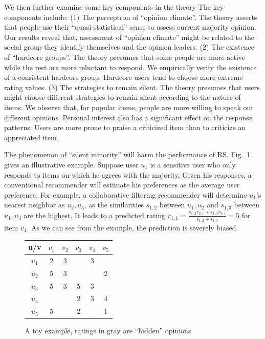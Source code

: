 \documentclass{sig-alternate}
\begin{document}
We then further examine some key components in the theory  The key components include: (1) The perceptron of ``opinion climate''. The theory asserts that people use their ``quasi-statistical'' sense to assess current majority opinion. Our results reveal that, assessment of ``opinion climate'' might be related to the social group they identify themselves and the opinion leaders. (2) The existence of ``hardcore groups''. The theory presumes that some people are more active while the rest are more reluctant to respond. We empirically verify the existence of a consistent hardcore group. Hardcore users tend to choose more extreme rating values. (3) The strategies to remain silent. The theory presumes that users might choose different strategies to remain silent according to the nature of items. We observe that, for popular items, people are more willing to speak out different opinions. Personal interest also has a significant effect on the response patterns. Users are more prone to praise a criticized item than to criticize an appreciated item.


The phenomenon of ``silent minority'' will harm the performance of RS. Fig.~\ref{fig:example} gives an illustrative example. Suppose user $u_1$ is a sensitive user who only responds to items on which he agrees with the majority. Given his responses, a conventional recommender will estimate his preferences as the average user preference. For example, a collaborative filtering recommender will determine $u_1$'s nearest neighbor as $u_2,u_3$, as the similarities    $s_{1,2}$ between $u_1,u_2$ and $s_{1,3}$ between $u_1,u_3$ are the highest. It leads to a predicted rating $r_{1,1}=\frac{s_{1,2} r_{2,1}+s_{1,3} r_{3,1}}{s_{1,2}+s_{1,3} }=5$ for item $v_1$. As we can see from the example, the prediction is severely biased.

\begin{figure}\label{fig:example}
\centering
\tiny
\begin{tabular}{|c|c|c|c|c|c|}
\hline
u/v & $v_1$ & $v_2$ & $v_3$ & $v_4$ & $v_5$ \\\hline\hline
 $u_1$ & \color{mygray}2 & 3 & & 3 &  \\\hline
 $u_2$ & 5 & 3 & &  &2 \\\hline
 $u_3$ & 5 & 3 &5 & 3 & \\\hline
 $u_4$ &  &  &2 & 3 & 4 \\\hline
 $u_5$ & 5 &  &2 &  &  1\\\hline
\end{tabular}
\caption{A toy example, ratings in gray are ``hidden'' opinions}
\end{figure}
\end{document}
